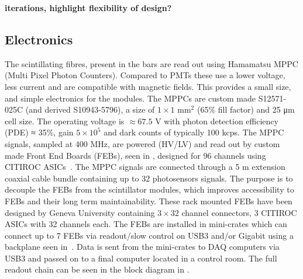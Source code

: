 \textbf{iterations, highlight flexibility of design?}

\subsection{Electronics}
The scintillating fibres, present in the bars are read out using Hamamatsu MPPC (Multi Pixel Photon Counters). Compared to PMTs these use a lower voltage, less current and are compatible with magnetic fields. This provides a small size, and simple electronics for the modules. The MPPCs are custom made S12571-025C (and derived S10943-5796), a size of $1\times1$ mm$^2$ (65\% fill factor) and 25 μm cell size. The operating voltage is $\approx 67.5$ V with photon detection efficiency (PDE) ≈ 35\%, gain $5 \times 10^5$ and dark counts of typically 100 kcps. The MPPC signals, sampled at 400 MHz, are powered (HV/LV) and read out by custom made Front End Boards (FEBs), seen in , designed for 96 channels using CITIROC ASICs~\cite{78EASIROC}. The MPPC signals are connected through a 5 m extension coaxial cable bundle containing up to 32 photosensors signals. The purpose is to decouple the FEBs from the scintillator modules, which improves accessibility to FEBs and their long term maintainability. These rack mounted FEBs have been designed by Geneva University containing $3 \times 32$ channel connectors, 3 CITIROC ASICs with 32 channels each. The FEBs are installed in mini-crates which can connect up to 7 FEBs via readout/slow control on USB3 and/or Gigabit using a backplane seen in~. 
Data is sent from the mini-crates to DAQ computers via USB3 and passed on to a final computer located in a control room. The full readout chain can be seen in the block diagram in .




